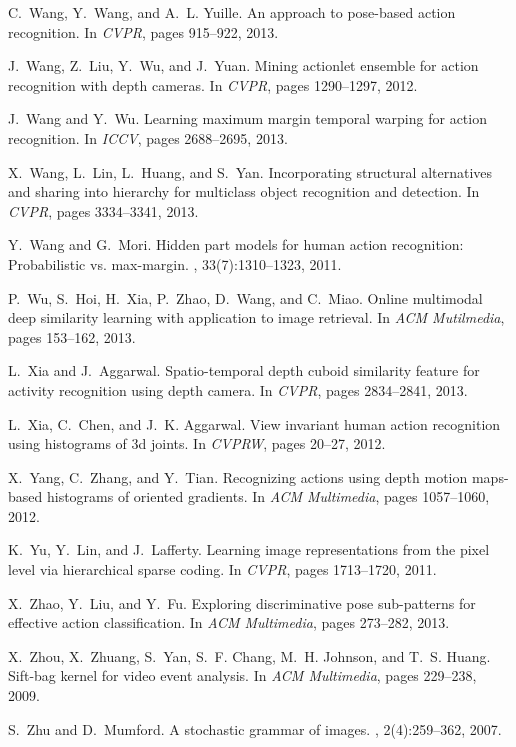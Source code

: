 \documentclass{sig-alternate}
\begin{document}
\begin{thebibliography}{40}
C.~Wang, Y.~Wang, and A.~L. Yuille.
\newblock An approach to pose-based action recognition.
\newblock In {\em CVPR}, pages 915--922, 2013.


J.~Wang, Z.~Liu, Y.~Wu, and J.~Yuan.
\newblock Mining actionlet ensemble for action recognition with depth cameras.
\newblock In {\em CVPR}, pages 1290--1297, 2012.

\vfill\eject

J.~Wang and Y.~Wu.
\newblock Learning maximum margin temporal warping for action recognition.
\newblock In {\em ICCV}, pages 2688--2695, 2013.


X.~Wang, L.~Lin, L.~Huang, and S.~Yan.
\newblock Incorporating structural alternatives and sharing into hierarchy for
  multiclass object recognition and detection.
\newblock In {\em CVPR}, pages 3334--3341, 2013.


Y.~Wang and G.~Mori.
\newblock Hidden part models for human action recognition: Probabilistic vs.
  max-margin.
, 33(7):1310--1323,
  2011.

P.~Wu, S.~Hoi, H.~Xia, P.~Zhao, D.~Wang, and C.~Miao.
\newblock Online multimodal deep similarity learning with application to image
  retrieval.
\newblock In {\em ACM Mutilmedia}, pages 153--162, 2013.

L.~Xia and J.~Aggarwal.
\newblock Spatio-temporal depth cuboid similarity feature for activity
  recognition using depth camera.
\newblock In {\em CVPR}, pages 2834--2841, 2013.

L.~Xia, C.~Chen, and J.~K. Aggarwal.
\newblock View invariant human action recognition using histograms of 3d
  joints.
\newblock In {\em CVPRW}, pages 20--27, 2012.

X.~Yang, C.~Zhang, and Y.~Tian.
\newblock Recognizing actions using depth motion maps-based histograms of
  oriented gradients.
\newblock In {\em ACM Multimedia}, pages 1057--1060, 2012.

K.~Yu, Y.~Lin, and J.~Lafferty.
\newblock Learning image representations from the pixel level via hierarchical
  sparse coding.
\newblock In {\em CVPR}, pages 1713--1720, 2011.

X.~Zhao, Y.~Liu, and Y.~Fu.
\newblock Exploring discriminative pose sub-patterns for effective action
  classification.
\newblock In {\em ACM Multimedia}, pages 273--282, 2013.

X.~Zhou, X.~Zhuang, S.~Yan, S.~F. Chang, M.~H. Johnson, and T.~S. Huang.
\newblock Sift-bag kernel for video event analysis.
\newblock In {\em ACM Multimedia}, pages 229--238, 2009.

S.~Zhu and D.~Mumford.
\newblock A stochastic grammar of images.
,
  2(4):259--362, 2007.

\end{thebibliography}
\end{document}
